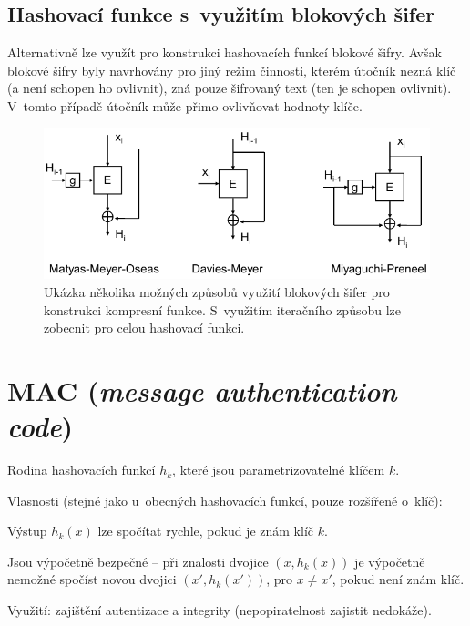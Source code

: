 \subsection{Hashovací funkce s~využitím blokových šifer}

Alternativně lze využít pro konstrukci hashovacích funkcí blokové šifry. Avšak blokové šifry byly navrhovány pro jiný režim činnosti, kterém útočník nezná klíč (a není schopen ho ovlivnit), zná pouze šifrovaný text (ten je schopen ovlivnit). V~tomto případě útočník může přimo ovlivňovat hodnoty klíče.

\begin{figure}[H]
    \centering
    \includegraphics[width=0.9\linewidth]{hash_function_blocks.pdf}
    \caption{Ukázka několika možných způsobů využití blokových šifer pro konstrukci kompresní funkce. S~využitím iteračního způsobu lze zobecnit pro celou hashovací funkci.}
\end{figure}


\section{MAC (\textit{message authentication code})}

\begin{compactitem}
    \item Rodina hashovacích funkcí $h_k$, které jsou parametrizovatelné klíčem $k$.
    \item Vlasnosti (stejné jako u~obecných hashovacích funkcí, pouze rozšířené o~klíč): \begin{compactitem}
        \item Výstup $h_k(x)$ lze spočítat rychle, pokud je znám klíč $k$.
        \item Jsou výpočetně bezpečné -- při znalosti dvojice $(x, h_k(x))$ je výpočetně nemožné spočíst novou dvojici $(x', h_k(x'))$, pro $x \neq x'$, pokud není znám klíč.
    \end{compactitem}
    \item Využití: zajištění autentizace a integrity (nepopiratelnost zajistit nedokáže).
\end{compactitem}

